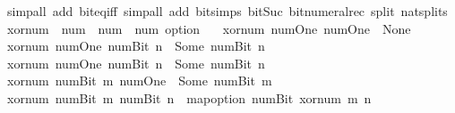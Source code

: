 \begin{isabellebody}
\isamarkupfalse%
\ {\isacharparenleft}{\kern0pt}simp{\isacharunderscore}{\kern0pt}all\ add{\isacharcolon}{\kern0pt}\ bit{\isacharunderscore}{\kern0pt}eq{\isacharunderscore}{\kern0pt}iff{\isacharparenright}{\kern0pt}\ {\isacharparenleft}{\kern0pt}simp{\isacharunderscore}{\kern0pt}all\ add{\isacharcolon}{\kern0pt}\ bit{\isacharunderscore}{\kern0pt}simps\ bit{\isacharunderscore}{\kern0pt}Suc\ bit{\isacharunderscore}{\kern0pt}numeral{\isacharunderscore}{\kern0pt}rec\ split{\isacharcolon}{\kern0pt}\ nat{\isachardot}{\kern0pt}splits{\isacharparenright}{\kern0pt}%
\endisatagproof
{\isafoldproof}%
%
\isadelimproof
\isanewline
%
\endisadelimproof
\isanewline
{}\isamarkupfalse%
\ xor{\isacharunderscore}{\kern0pt}num\ {\isacharcolon}{\kern0pt}{\isacharcolon}{\kern0pt}\ {\isacartoucheopen}num\ {\isasymRightarrow}\ num\ {\isasymRightarrow}\ num\ option{\isacartoucheclose}\ \isanewline
{}\isanewline
\ \ {\isacartoucheopen}xor{\isacharunderscore}{\kern0pt}num\ num{\isachardot}{\kern0pt}One\ num{\isachardot}{\kern0pt}One\ {\isacharequal}{\kern0pt}\ None{\isacartoucheclose}\isanewline
{\isacharbar}{\kern0pt}\ {\isacartoucheopen}xor{\isacharunderscore}{\kern0pt}num\ num{\isachardot}{\kern0pt}One\ {\isacharparenleft}{\kern0pt}num{\isachardot}{\kern0pt}Bit{}\ n{\isacharparenright}{\kern0pt}\ {\isacharequal}{\kern0pt}\ Some\ {\isacharparenleft}{\kern0pt}num{\isachardot}{\kern0pt}Bit{}\ n{\isacharparenright}{\kern0pt}{\isacartoucheclose}\isanewline
{\isacharbar}{\kern0pt}\ {\isacartoucheopen}xor{\isacharunderscore}{\kern0pt}num\ num{\isachardot}{\kern0pt}One\ {\isacharparenleft}{\kern0pt}num{\isachardot}{\kern0pt}Bit{}\ n{\isacharparenright}{\kern0pt}\ {\isacharequal}{\kern0pt}\ Some\ {\isacharparenleft}{\kern0pt}num{\isachardot}{\kern0pt}Bit{}\ n{\isacharparenright}{\kern0pt}{\isacartoucheclose}\isanewline
{\isacharbar}{\kern0pt}\ {\isacartoucheopen}xor{\isacharunderscore}{\kern0pt}num\ {\isacharparenleft}{\kern0pt}num{\isachardot}{\kern0pt}Bit{}\ m{\isacharparenright}{\kern0pt}\ num{\isachardot}{\kern0pt}One\ {\isacharequal}{\kern0pt}\ Some\ {\isacharparenleft}{\kern0pt}num{\isachardot}{\kern0pt}Bit{}\ m{\isacharparenright}{\kern0pt}{\isacartoucheclose}\isanewline
{\isacharbar}{\kern0pt}\ {\isacartoucheopen}xor{\isacharunderscore}{\kern0pt}num\ {\isacharparenleft}{\kern0pt}num{\isachardot}{\kern0pt}Bit{}\ m{\isacharparenright}{\kern0pt}\ {\isacharparenleft}{\kern0pt}num{\isachardot}{\kern0pt}Bit{}\ n{\isacharparenright}{\kern0pt}\ {\isacharequal}{\kern0pt}\ map{\isacharunderscore}{\kern0pt}option\ num{\isachardot}{\kern0pt}Bit{}\ {\isacharparenleft}{\kern0pt}xor{\isacharunderscore}{\kern0pt}num\ m\ n{\isacharparenright}{\kern0pt}{\isacartoucheclose}\isanewline

\end{isabellebody}
